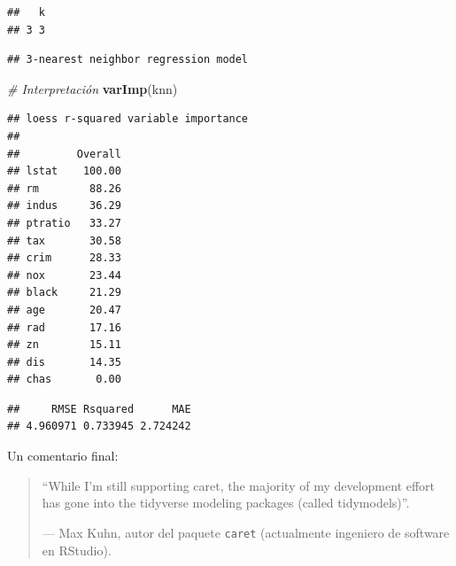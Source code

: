 \documentclass[
]{book}
\newenvironment{Shaded}{\begin{snugshade}}{\end{snugshade}}
\newcommand{\CommentTok}[1]{\textcolor[rgb]{0.56,0.35,0.01}{\textit{#1}}}
\newcommand{\DataTypeTok}[1]{\textcolor[rgb]{0.13,0.29,0.53}{#1}}
\newcommand{\KeywordTok}[1]{\textcolor[rgb]{0.13,0.29,0.53}{\textbf{#1}}}
\newcommand{\NormalTok}[1]{#1}
\newcommand{\OperatorTok}[1]{\textcolor[rgb]{0.81,0.36,0.00}{\textbf{#1}}}
\theoremstyle{break}
\theoremstyle{definition}
\theoremstyle{definition}
\theoremstyle{definition}
\theoremstyle{remark}
\begin{document}
\begin{verbatim}
##   k
## 3 3
\end{verbatim}

\begin{Shaded}
\end{Shaded}

\begin{verbatim}
## 3-nearest neighbor regression model
\end{verbatim}

\begin{Shaded}
\begin{Highlighting}[]
\CommentTok{# Interpretación}
\KeywordTok{varImp}\NormalTok{(knn)}
\end{Highlighting}
\end{Shaded}

\begin{verbatim}
## loess r-squared variable importance
## 
##         Overall
## lstat    100.00
## rm        88.26
## indus     36.29
## ptratio   33.27
## tax       30.58
## crim      28.33
## nox       23.44
## black     21.29
## age       20.47
## rad       17.16
## zn        15.11
## dis       14.35
## chas       0.00
\end{verbatim}

\begin{Shaded}
\end{Shaded}

\begin{verbatim}
##     RMSE Rsquared      MAE 
## 4.960971 0.733945 2.724242
\end{verbatim}

Un comentario final:

\begin{quote}
``While I'm still supporting caret, the majority of my development effort has gone into the tidyverse modeling packages (called tidymodels)''.

--- Max Kuhn, autor del paquete \texttt{caret} (actualmente ingeniero de software en RStudio).
\end{quote}
\end{document}
